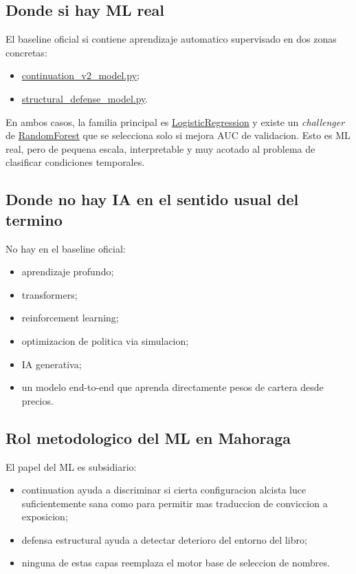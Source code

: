 \documentclass[11pt,letterpaper]{article}
\newcommand{\code}[1]{{\urlstyle{tt}\url{#1}}}
\begin{document}
\subsection{Donde si hay ML real}
El baseline oficial si contiene aprendizaje automatico supervisado en dos zonas concretas:
\begin{itemize}
    \item \code{continuation\_v2\_model.py};
    \item \code{structural\_defense\_model.py}.
\end{itemize}

En ambos casos, la familia principal es \code{LogisticRegression} y existe un \emph{challenger} de \code{RandomForest} que se selecciona solo si mejora AUC de validacion. Esto es ML real, pero de pequena escala, interpretable y muy acotado al problema de clasificar condiciones temporales.

\subsection{Donde no hay IA en el sentido usual del termino}
No hay en el baseline oficial:
\begin{itemize}
    \item aprendizaje profundo;
    \item transformers;
    \item reinforcement learning;
    \item optimizacion de politica via simulacion;
    \item IA generativa;
    \item un modelo end-to-end que aprenda directamente pesos de cartera desde precios.
\end{itemize}

\subsection{Rol metodologico del ML en Mahoraga}
El papel del ML es subsidiario:
\begin{itemize}
    \item continuation ayuda a discriminar si cierta configuracion alcista luce suficientemente sana como para permitir mas traduccion de conviccion a exposicion;
    \item defensa estructural ayuda a detectar deterioro del entorno del libro;
    \item ninguna de estas capas reemplaza el motor base de seleccion de nombres.
\end{itemize}
\end{document}
